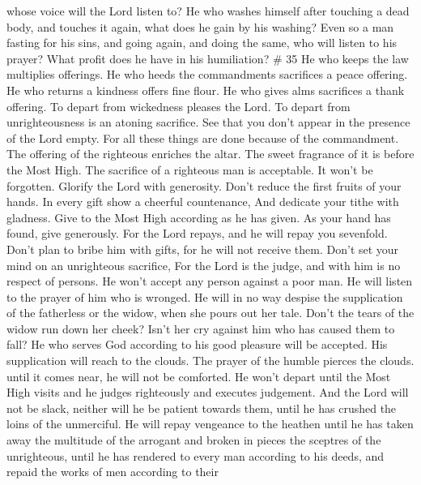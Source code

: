 whose voice will the Lord listen to?  He who washes himself
after touching a dead body, and touches it again, what does he gain by
his washing?  Even so a man fasting for his sins, and going
again, and doing the same, who will listen to his prayer? What profit
does he have in his humiliation? \# 35  He who keeps the law
multiplies offerings. He who heeds the commandments sacrifices a peace
offering.  He who returns a kindness offers fine flour. He
who gives alms sacrifices a thank offering.  To depart from
wickedness pleases the Lord. To depart from unrighteousness is an
atoning sacrifice.  See that you don't appear in the
presence of the Lord empty.  For all these things are done
because of the commandment.  The offering of the righteous
enriches the altar. The sweet fragrance of it is before the Most High.
 The sacrifice of a righteous man is acceptable. It won't be
forgotten.  Glorify the Lord with generosity. Don't reduce
the first fruits of your hands.  In every gift show a
cheerful countenance, And dedicate your tithe with gladness.
 Give to the Most High according as he has given. As your
hand has found, give generously.  For the Lord repays, and
he will repay you sevenfold.  Don't plan to bribe him with
gifts, for he will not receive them. Don't set your mind on an
unrighteous sacrifice, For the Lord is the judge, and with him is no
respect of persons.  He won't accept any person against a
poor man. He will listen to the prayer of him who is wronged.
 He will in no way despise the supplication of the
fatherless or the widow, when she pours out her tale. 
Don't the tears of the widow run down her cheek? Isn't her cry against
him who has caused them to fall?  He who serves God
according to his good pleasure will be accepted. His supplication will
reach to the clouds.  The prayer of the humble pierces the
clouds. until it comes near, he will not be comforted. He won't depart
until the Most High visits and he judges righteously and executes
judgement.  And the Lord will not be slack, neither will he
be patient towards them, until he has crushed the loins of the
unmerciful. He will repay vengeance to the heathen until he has taken
away the multitude of the arrogant and broken in pieces the sceptres of
the unrighteous,  until he has rendered to every man
according to his deeds, and repaid the works of men according to their
